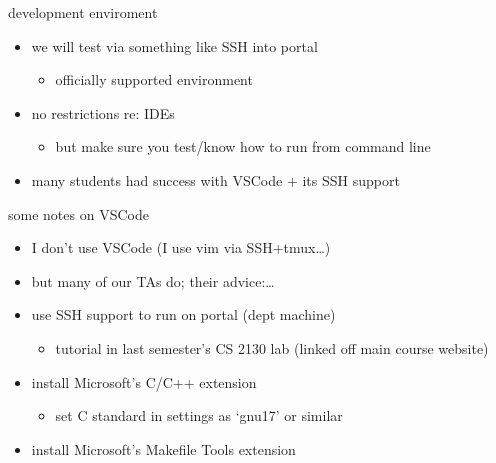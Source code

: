 \begin{frame}{development enviroment}
    \begin{itemize}
    \item we will test via something like SSH into portal
	\begin{itemize}
	\item officially supported environment
	\end{itemize}
    \vspace{.5cm}
    \item no restrictions re: IDEs
	\begin{itemize}
	\item but make sure you test/know how to run from command line
	\end{itemize}
    \item many students had success with VSCode + its SSH support
    \end{itemize}
\end{frame}

\begin{frame}{some notes on VSCode}
    \begin{itemize}
    \item I don't use VSCode (I use vim via SSH+tmux\ldots) 
    \item but many of our TAs do; their advice:\ldots
    \vspace{.5cm}
    \item use SSH support to run on portal (dept machine)
        \begin{itemize}
        \item tutorial in last semester's CS 2130 lab (linked off main course website)
        \end{itemize}
    \item install Microsoft's C/C++ extension
        \begin{itemize}
        \item set C standard in settings as `gnu17' or similar
        \end{itemize}
    \item install Microsoft's Makefile Tools extension
    \end{itemize}
\end{frame}
